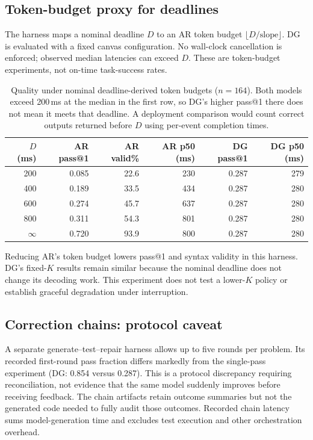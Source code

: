 \subsection{Token-budget proxy for deadlines}

The harness maps a nominal deadline $D$ to an AR token budget
$\lfloor D/\text{slope}\rfloor$. DG is evaluated with a fixed canvas
configuration. No wall-clock cancellation is enforced; observed median
latencies can exceed $D$. These are token-budget experiments, not
on-time task-success rates.

\begin{table}[ht]
\centering
\caption{Quality under nominal deadline-derived token budgets
($n{=}164$). Both models exceed 200\,ms at the median in the first
row, so DG's higher pass@1 there does not mean it meets that deadline.
A deployment comparison would count correct outputs returned before $D$
using per-event completion times.}
\label{tab:deadline}
\begin{tabular}{@{}rrrrrr@{}}
\toprule
$D$ (ms) & AR pass@1 & AR valid\% & AR p50 (ms) & DG pass@1 & DG p50 (ms) \\
\midrule
200  & 0.085 & 22.6 & 230 & 0.287 & 279 \\
400  & 0.189 & 33.5 & 434 & 0.287 & 280 \\
600  & 0.274 & 45.7 & 637 & 0.287 & 280 \\
800  & 0.311 & 54.3 & 801 & 0.287 & 280 \\
$\infty$ & 0.720 & 93.9 & 800 & 0.287 & 280 \\
\bottomrule
\end{tabular}
\end{table}

Reducing AR's token budget lowers pass@1 and syntax validity in
this harness. DG's fixed-$K$ results remain similar because the nominal
deadline does not change its decoding work. This experiment does not test
a lower-$K$ policy or establish graceful degradation under interruption.

\subsection{Correction chains: protocol caveat}

A separate generate--test--repair harness allows up to five rounds
per problem. Its recorded first-round pass fraction differs markedly
from the single-pass experiment (DG: 0.854 versus 0.287). This is a
protocol discrepancy requiring reconciliation, not evidence that the
same model suddenly improves before receiving feedback. The chain
artifacts retain outcome summaries but not the generated code needed to
fully audit those outcomes. Recorded chain latency sums model-generation
time and excludes test execution and other orchestration overhead.

